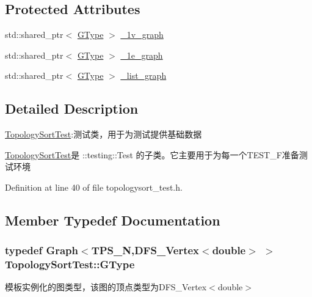 \subsection*{Protected Attributes}
\begin{DoxyCompactItemize}
\item 
std\+::shared\+\_\+ptr$<$ \hyperlink{class_topology_sort_test_aa530f6f774d1b97dbb3968d9e445ce21}{G\+Type} $>$ \hyperlink{class_topology_sort_test_a087401853f564307534465e2ac59c0ef}{\+\_\+1v\+\_\+graph}
\item 
std\+::shared\+\_\+ptr$<$ \hyperlink{class_topology_sort_test_aa530f6f774d1b97dbb3968d9e445ce21}{G\+Type} $>$ \hyperlink{class_topology_sort_test_af1fe553500cfb175b236a0302d9044af}{\+\_\+1e\+\_\+graph}
\item 
std\+::shared\+\_\+ptr$<$ \hyperlink{class_topology_sort_test_aa530f6f774d1b97dbb3968d9e445ce21}{G\+Type} $>$ \hyperlink{class_topology_sort_test_ac664dd33d2aa257a993c1835caa0d5ad}{\+\_\+list\+\_\+graph}
\end{DoxyCompactItemize}


\subsection{Detailed Description}
\hyperlink{class_topology_sort_test}{Topology\+Sort\+Test}\+:测试类，用于为测试提供基础数据 

{\ttfamily \hyperlink{class_topology_sort_test}{Topology\+Sort\+Test}}是 {\ttfamily \+::testing\+::\+Test} 的子类。它主要用于为每一个{\ttfamily T\+E\+S\+T\+\_\+\+F}准备测试环境 

Definition at line 40 of file topologysort\+\_\+test.\+h.



\subsection{Member Typedef Documentation}
\hypertarget{class_topology_sort_test_aa530f6f774d1b97dbb3968d9e445ce21}{}
\subsubsection[{G\+Type}]{\setlength{\rightskip}{0pt plus 5cm}typedef {\bf Graph}$<$T\+P\+S\+\_\+\+N,{\bf D\+F\+S\+\_\+\+Vertex}$<$double$>$ $>$ {\bf Topology\+Sort\+Test\+::\+G\+Type}}\label{class_topology_sort_test_aa530f6f774d1b97dbb3968d9e445ce21}
模板实例化的图类型，该图的顶点类型为{\ttfamily D\+F\+S\+\_\+\+Vertex$<$double$>$} 

